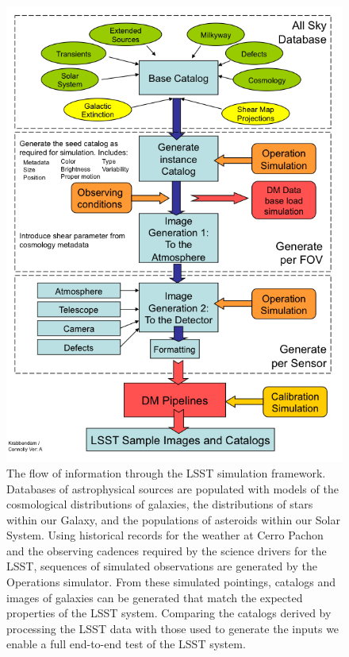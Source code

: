 \documentclass[]{article}
\begin{document}
\begin{figure}[t]
\centerline{\includegraphics[scale=.95]{validation_figures/flow.png}}
%
%
\caption{The flow of information through the LSST simulation
  framework. Databases of astrophysical sources are populated with
  models of the cosmological distributions of galaxies, the
  distributions of stars within our Galaxy, and the populations of
  asteroids within our Solar System. Using historical records for the
  weather at Cerro Pachon and the observing cadences required by the
  science drivers for the LSST, sequences of simulated observations
  are generated by the Operations simulator. From these simulated
  pointings, catalogs and images of galaxies can be generated that
  match the expected properties of the LSST system. Comparing the
  catalogs derived by processing the LSST data with those used to
  generate the inputs we enable a full end-to-end test of the LSST
  system.}
\label{fig:flow}       %
\end{figure}
\end{document}
